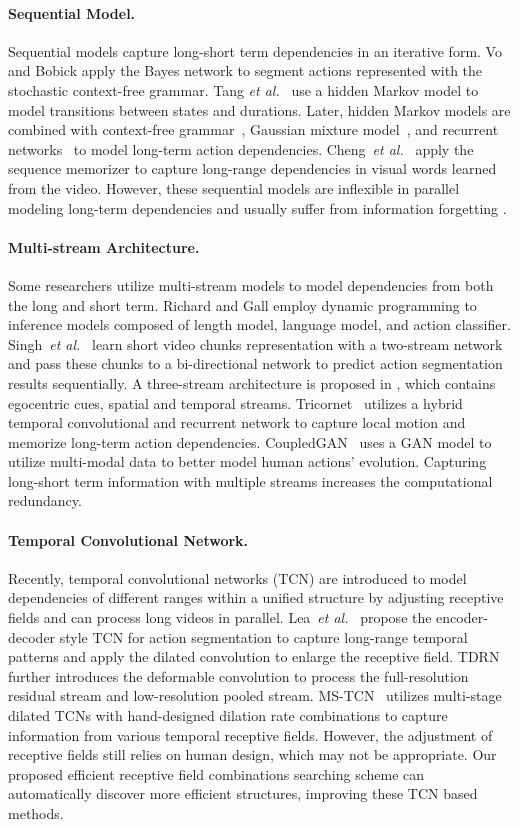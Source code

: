 \documentclass[final]{cvpr}
\newcommand{\myPara}[1]{\vspace{-.12in}\paragraph{#1}}
\def\etal{{\em et al.}}
\begin{document}
\myPara{Sequential Model.}
Sequential models capture long-short term dependencies in an iterative form.
Vo and Bobick \cite{vo2014stochastic} apply the Bayes network to 
segment actions represented with the stochastic context-free grammar.
Tang \etal~\cite{tang2012learning} use a hidden Markov model
to model transitions between states and durations.
Later, hidden Markov models are combined with 
context-free grammar~\cite{kuehne2016end}, 
Gaussian mixture model~\cite{kuehne2017weakly}, 
and recurrent networks~\cite{richard2017weakly,kuehne2018hybrid} 
to model long-term action dependencies.
Cheng~\etal~\cite{cheng2014temporal} apply the sequence memorizer 
to capture long-range dependencies in visual words learned from the video.
However, these sequential models are inflexible in parallel modeling 
long-term dependencies and usually suffer from 
information forgetting \cite{farha2019ms,MS-TCN-PAMI20}.


\myPara{Multi-stream Architecture.}
Some researchers
\cite{richard2016temporal,singh2016multi,singh2016first,ding2017tricornet} 
utilize multi-stream models to model dependencies 
from both the long and short term.
Richard and Gall employ \cite{richard2016temporal} dynamic programming 
to inference models composed of length model, 
language model, and action classifier.
Singh~\etal~\cite{singh2016multi} learn short video chunks representation 
with a two-stream network and pass these chunks to a bi-directional network 
to predict action segmentation results sequentially.
A three-stream architecture is proposed in \cite{singh2016first}, 
which contains egocentric cues, spatial and temporal streams.
Tricornet~\cite{ding2017tricornet} utilizes a hybrid temporal convolutional 
and recurrent network to capture local motion and 
memorize long-term action dependencies. 
CoupledGAN~\cite{gammulle2019coupled} uses a GAN model to utilize 
multi-modal data to better model human actions' evolution.
Capturing long-short term information with multiple streams increases 
the computational redundancy.  


\myPara{Temporal Convolutional Network.}
Recently, temporal convolutional networks (TCN) are introduced to model 
dependencies of different ranges within a unified structure by adjusting receptive fields and can process long videos in parallel.
Lea~\etal~\cite{lea2017temporal} propose the encoder-decoder style TCN 
for action segmentation to capture long-range temporal patterns 
and apply the dilated convolution to enlarge the receptive field.
TDRN~\cite{lei2018temporal} further introduces the deformable convolution 
to process the full-resolution residual stream and low-resolution pooled stream.
MS-TCN~\cite{farha2019ms,MS-TCN-PAMI20} utilizes multi-stage dilated TCNs with 
hand-designed dilation rate combinations to capture information from 
various temporal receptive fields.
However, the adjustment of receptive fields still relies on human design,
which may not be appropriate.
Our proposed efficient receptive field combinations searching scheme 
can automatically discover more efficient structures, 
improving these TCN based methods.
\end{document}
